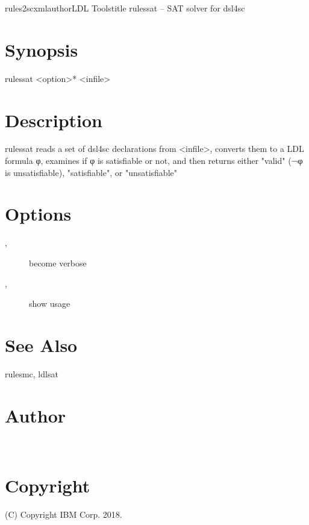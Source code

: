 \documentclass[fancy]{article}
\begin{document}
\begin{Name}{1}{rules2scxml}{author}{LDL Tools}{title}
rulessat -- SAT solver for dsl4sc
\end{Name}

\section{Synopsis}
rulessat <option>* <infile>

\section{Description}
rulessat reads a set of dsl4sc declarations from <infile>,
converts them to a LDL formula φ,
examines if φ is satisfiable or not, and then
returns either "valid" (¬φ is unsatisfiable), "satisfiable", or "unsatisfiable"

\section{Options}
\begin{description}
\item[, ]
become verbose
%
\item[, ]
show usage
\end{description}

\section{See Also}
rulesmc, ldlsat

\section{Author}
\\

\section{Copyright}
(C) Copyright IBM Corp. 2018.
\end{document}
